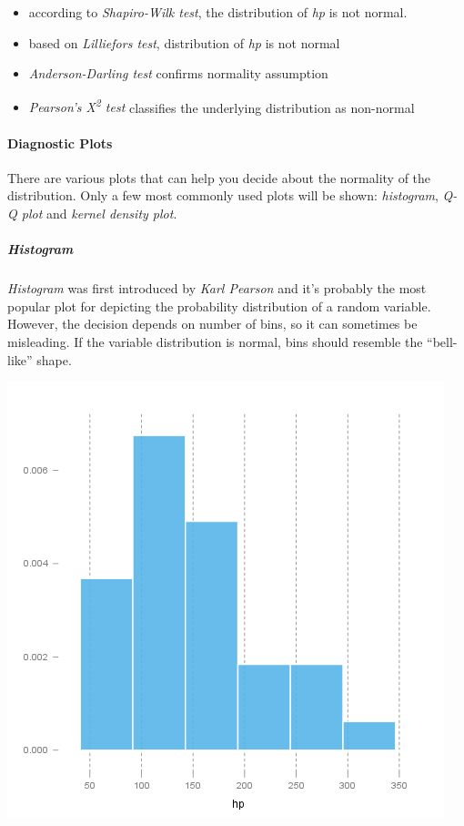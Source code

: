 \documentclass[]{article}
\makeatletter
\def\maxwidth{\ifdim\Gin@nat@width>\linewidth\linewidth
\else\Gin@nat@width\fi}
\let\Oldincludegraphics\includegraphics
\renewcommand{\includegraphics}[1]{\Oldincludegraphics[width=\maxwidth]{#1}}
\makeatother
\begin{document}
\begin{itemize}
\item
  according to \emph{Shapiro-Wilk test}, the distribution of \emph{hp}
  is not normal.
\item
  based on \emph{Lilliefors test}, distribution of \emph{hp} is not
  normal
\item
  \emph{Anderson-Darling test} confirms normality assumption
\item
  \emph{Pearson's Χ\textsuperscript{2} test} classifies the underlying
  distribution as non-normal
\end{itemize}
\paragraph{Diagnostic Plots}

There are various plots that can help you decide about the normality of
the distribution. Only a few most commonly used plots will be shown:
\emph{histogram}, \emph{Q-Q plot} and \emph{kernel density plot}.

\subparagraph{Histogram}

\emph{Histogram} was first introduced by \emph{Karl Pearson} and it's
probably the most popular plot for depicting the probability
distribution of a random variable. However, the decision depends on
number of bins, so it can sometimes be misleading. If the variable
distribution is normal, bins should resemble the ``bell-like'' shape.

\href{78517cde85fc1ba06a3513dd17e567da-hires.png}{\includegraphics{78517cde85fc1ba06a3513dd17e567da.png}}
\end{document}
